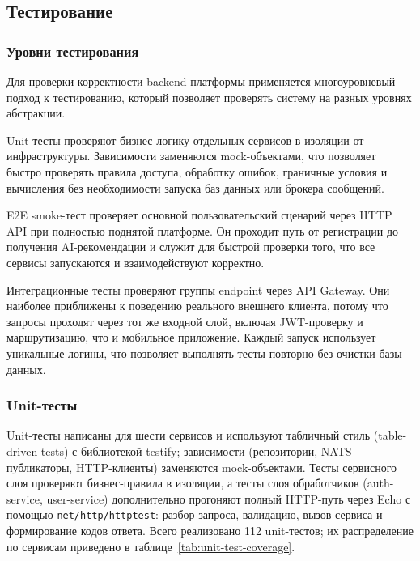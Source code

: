 \subsection{Тестирование}

\subsubsection{Уровни тестирования}

Для проверки корректности backend-платформы применяется многоуровневый подход к тестированию, который позволяет проверять систему на разных уровнях абстракции.

Unit-тесты проверяют бизнес-логику отдельных сервисов в изоляции от инфраструктуры. Зависимости заменяются mock-объектами, что позволяет быстро проверять правила доступа, обработку ошибок, граничные условия и вычисления без необходимости запуска баз данных или брокера сообщений.

E2E smoke-тест проверяет основной пользовательский сценарий через HTTP API при полностью поднятой платформе. Он проходит путь от регистрации до получения AI-рекомендации и служит для быстрой проверки того, что все сервисы запускаются и взаимодействуют корректно.

Интеграционные тесты проверяют группы endpoint через API Gateway. Они наиболее приближены к поведению реального внешнего клиента, потому что запросы проходят через тот же входной слой, включая JWT-проверку и маршрутизацию, что и мобильное приложение. Каждый запуск использует уникальные логины, что позволяет выполнять тесты повторно без очистки базы данных.

\subsubsection{Unit-тесты}

Unit-тесты написаны для шести сервисов и используют табличный стиль (table-driven tests) с библиотекой testify; зависимости (репозитории, NATS-публикаторы, HTTP-клиенты) заменяются mock-объектами. Тесты сервисного слоя проверяют бизнес-правила в изоляции, а тесты слоя обработчиков (auth-service, user-service) дополнительно прогоняют полный HTTP-путь через Echo с помощью \passthrough{\lstinline!net/http/httptest!}: разбор запроса, валидацию, вызов сервиса и формирование кодов ответа. Всего реализовано 112 unit-тестов; их распределение по сервисам приведено в таблице~\ref{tab:unit-test-coverage}.

